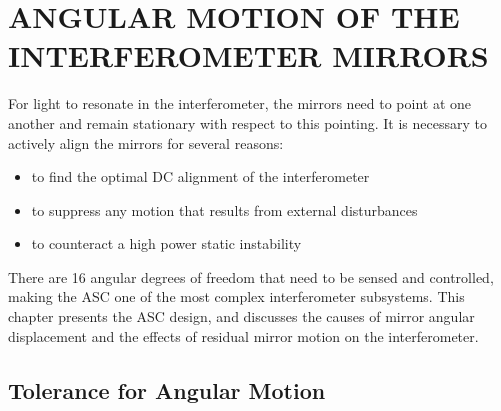 \chapter{ANGULAR MOTION OF THE INTERFEROMETER MIRRORS}

For light to resonate in the interferometer, the mirrors need to point at one another and remain stationary with respect to this pointing. It is necessary to actively align the mirrors for several reasons:
\begin{itemize}
\item to find the optimal DC alignment of the interferometer \vspace{-10 pt}
\item to suppress any motion that results from external disturbances \vspace{-10 pt}
\item to counteract a high power static instability
\end{itemize}
There are 16 angular degrees of freedom that need to be sensed and controlled, making the ASC one of the most complex interferometer subsystems. This chapter presents the ASC design, and discusses the causes of mirror angular displacement and the effects of residual mirror motion on the interferometer.















\section{Tolerance for Angular Motion}
\label{sec:tolerance}


